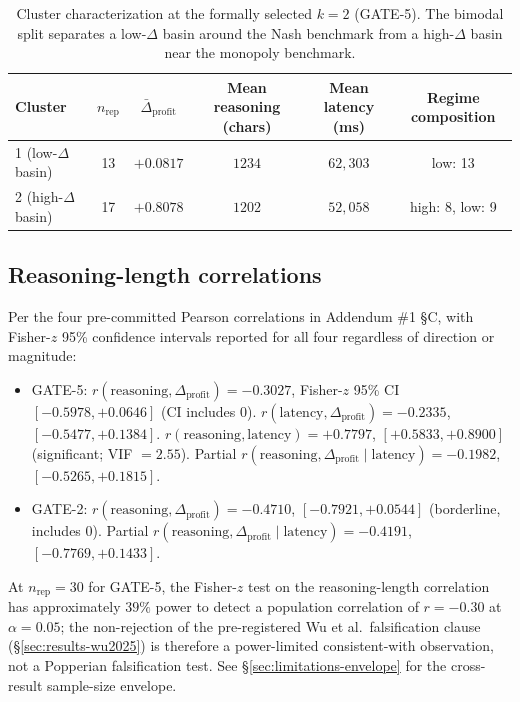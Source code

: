 \begin{table}[h]
\centering
\caption{Cluster characterization at the formally selected $k = 2$ (GATE-5). The bimodal split separates a low-$\Delta$ basin around the Nash benchmark from a high-$\Delta$ basin near the monopoly benchmark.}
\label{tab:cluster-chars}
\begin{tabular}{lccccc}
\toprule
Cluster & $n_{\text{rep}}$ & $\bar{\Delta}_{\text{profit}}$ & Mean reasoning (chars) & Mean latency (ms) & Regime composition \\
\midrule
1 (low-$\Delta$ basin)  & 13 & $+0.0817$ & $1234$ & $62{,}303$ & low: 13 \\
2 (high-$\Delta$ basin) & 17 & $+0.8078$ & $1202$ & $52{,}058$ & high: 8, low: 9 \\
\bottomrule
\end{tabular}
\end{table}

\subsection{Reasoning-length correlations}
\label{sec:results-reasoning}

Per the four pre-committed Pearson correlations in Addendum \#1 \S C, with Fisher-$z$ 95\% confidence intervals reported for all four regardless of direction or magnitude:

\begin{itemize}
    \item GATE-5: $r(\text{reasoning}, \Delta_{\text{profit}}) = -0.3027$, Fisher-$z$ 95\% CI $[-0.5978, +0.0646]$ (CI includes 0). $r(\text{latency}, \Delta_{\text{profit}}) = -0.2335$, $[-0.5477, +0.1384]$. $r(\text{reasoning}, \text{latency}) = +0.7797$, $[+0.5833, +0.8900]$ (significant; VIF $= 2.55$). Partial $r(\text{reasoning}, \Delta_{\text{profit}} \mid \text{latency}) = -0.1982$, $[-0.5265, +0.1815]$.
    \item GATE-2: $r(\text{reasoning}, \Delta_{\text{profit}}) = -0.4710$, $[-0.7921, +0.0544]$ (borderline, includes 0). Partial $r(\text{reasoning}, \Delta_{\text{profit}} \mid \text{latency}) = -0.4191$, $[-0.7769, +0.1433]$.
\end{itemize}

At $n_{\text{rep}} = 30$ for GATE-5, the Fisher-$z$ test on the reasoning-length correlation has approximately $39\%$ power to detect a population correlation of $r = -0.30$ at $\alpha = 0.05$; the non-rejection of the pre-registered Wu et al.\ falsification clause (\S\ref{sec:results-wu2025}) is therefore a power-limited consistent-with observation, not a Popperian falsification test. See \S\ref{sec:limitations-envelope} for the cross-result sample-size envelope.

